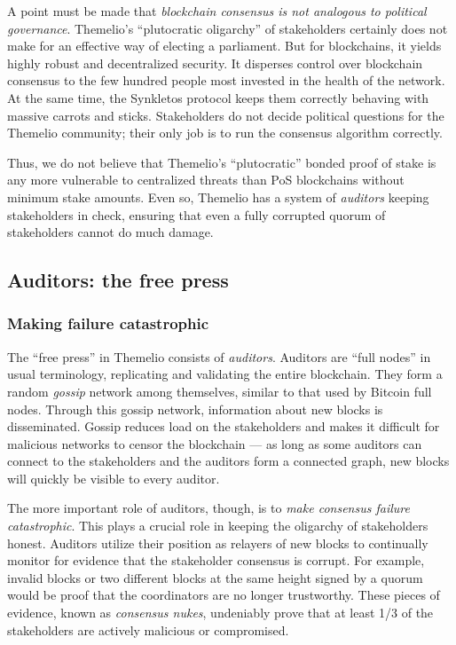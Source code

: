 \documentclass[headinclude,12pt]{scrbook}
\begin{document}
A point must be made that \emph{blockchain consensus is not analogous to
    political governance}. Themelio's ``plutocratic oligarchy'' of
stakeholders certainly does not make for an effective way of electing a
parliament. But for blockchains, it yields highly robust and
decentralized security. It disperses control over blockchain consensus
to the few hundred people most invested in the health of the network. At
the same time, the Synkletos protocol keeps them correctly behaving with
massive carrots and sticks. Stakeholders do not decide political
questions for the Themelio community; their only job is to run the
consensus algorithm correctly.

Thus, we do not believe that Themelio's ``plutocratic'' bonded proof of
stake is any more vulnerable to centralized threats than PoS blockchains
without minimum stake amounts. Even so, Themelio has a system of
\emph{auditors} keeping stakeholders in check, ensuring that even a
fully corrupted quorum of stakeholders cannot do much damage.

\subsection{Auditors: the free press}

\subsubsection{Making failure catastrophic}

The ``free press'' in Themelio consists of \emph{auditors}. Auditors are ``full nodes'' in usual terminology, replicating and validating the entire blockchain. They form a random \emph{gossip} network among themselves, similar to that used by Bitcoin full nodes. Through this gossip network, information about new blocks is disseminated. Gossip reduces load on the stakeholders and makes it difficult for malicious networks to censor the blockchain --- as long as some auditors can connect to the stakeholders and the auditors form a connected graph, new blocks will quickly be visible to every auditor.

The more important role of auditors, though, is to \textit{make consensus failure catastrophic}. This plays a crucial role in keeping the oligarchy of stakeholders honest. Auditors utilize their position as relayers of new blocks to continually monitor for evidence that the stakeholder consensus is corrupt. For example, invalid blocks or two different blocks at the same height signed by a quorum would be proof that the coordinators are no longer trustworthy. These pieces of evidence, known as \textit{consensus nukes}, undeniably prove that at least 1/3 of the stakeholders are actively malicious or compromised.
\end{document}

